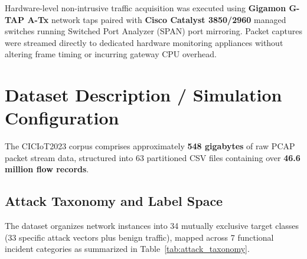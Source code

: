 \documentclass[12pt,a4paper]{report}
\begin{document}
Hardware-level non-intrusive traffic acquisition was executed using \textbf{Gigamon G-TAP A-Tx} network taps paired with \textbf{Cisco Catalyst 3850/2960} managed switches running Switched Port Analyzer (SPAN) port mirroring. Packet captures were streamed directly to dedicated hardware monitoring appliances without altering frame timing or incurring gateway CPU overhead.

\section{Dataset Description / Simulation Configuration}
The CICIoT2023 corpus comprises approximately \textbf{548 gigabytes} of raw PCAP packet stream data, structured into 63 partitioned CSV files containing over \textbf{46.6 million flow records}. 

\subsection{Attack Taxonomy and Label Space}
The dataset organizes network instances into 34 mutually exclusive target classes (33 specific attack vectors plus benign traffic), mapped across 7 functional incident categories as summarized in Table~\ref{tab:attack_taxonomy}.
\end{document}
